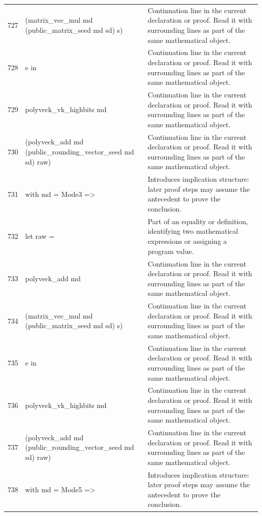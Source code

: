 \documentclass[10pt]{article}
\begin{document}
\begin{longtable}{r L{0.53\textwidth} L{0.37\textwidth}}
727 & {\ttfamily\scriptsize         (matrix\_vec\_mul md (public\_matrix\_seed md sd) s)} & Continuation line in the current declaration or proof.  Read it with surrounding lines as part of the same mathematical object. \\
728 & {\ttfamily\scriptsize         e in} & Continuation line in the current declaration or proof.  Read it with surrounding lines as part of the same mathematical object. \\
729 & {\ttfamily\scriptsize     polyveck\_vk\_highbits md} & Continuation line in the current declaration or proof.  Read it with surrounding lines as part of the same mathematical object. \\
730 & {\ttfamily\scriptsize       (polyveck\_add md (public\_rounding\_vector\_seed md sd) raw)} & Continuation line in the current declaration or proof.  Read it with surrounding lines as part of the same mathematical object. \\
731 & {\ttfamily\scriptsize   with md = Mode3 =>} & Introduces implication structure: later proof steps may assume the antecedent to prove the conclusion. \\
732 & {\ttfamily\scriptsize     let raw =} & Part of an equality or definition, identifying two mathematical expressions or assigning a program value. \\
733 & {\ttfamily\scriptsize       polyveck\_add md} & Continuation line in the current declaration or proof.  Read it with surrounding lines as part of the same mathematical object. \\
734 & {\ttfamily\scriptsize         (matrix\_vec\_mul md (public\_matrix\_seed md sd) s)} & Continuation line in the current declaration or proof.  Read it with surrounding lines as part of the same mathematical object. \\
735 & {\ttfamily\scriptsize         e in} & Continuation line in the current declaration or proof.  Read it with surrounding lines as part of the same mathematical object. \\
736 & {\ttfamily\scriptsize     polyveck\_vk\_highbits md} & Continuation line in the current declaration or proof.  Read it with surrounding lines as part of the same mathematical object. \\
737 & {\ttfamily\scriptsize       (polyveck\_add md (public\_rounding\_vector\_seed md sd) raw)} & Continuation line in the current declaration or proof.  Read it with surrounding lines as part of the same mathematical object. \\
738 & {\ttfamily\scriptsize   with md = Mode5 =>} & Introduces implication structure: later proof steps may assume the antecedent to prove the conclusion. \\

\end{longtable}
\end{document}

